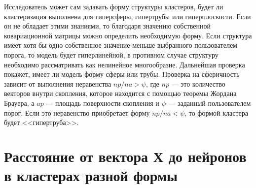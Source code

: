 \documentclass[unicode, 12pt, a4paper,oneside,fleqn]{article}
\begin{document}
Исследователь может сам задавать форму структуры кластеров, будет ли
кластеризация выполнена для гиперсферы, гипертрубы или
гиперплоскости. Если он не обладает этими знаниями, то благодаря
значению собственной ковариационной матрицы можно определить
необходимую форму. Если структура имеет хотя бы одно собственное
значение меньше выбранного пользователем порога, то модель будет
гиперлинейной, в противном случае структуру необходимо рассматривать
как нелинейное многообразие. Дальнейшая проверка покажет, имеет ли
модель форму сферы или трубы. Проверка на сферичность зависит от
выполнения неравенства $np/na > \psi$, где $np$ — это количество
векторов внутри скопления, которое находится с помощью теоремы Жордана
Брауера, а $ap$ — площадь поверхности скопления и $\psi$ — заданный
пользователем порог. Если это неравенство приобретает форму
$np/na < \psi$, то формой кластера будет <<гипертруба>>.

\section{Расстояние от вектора Х до нейронов в кластерах разной формы}
\end{document}
